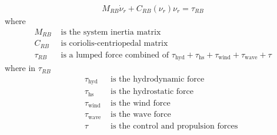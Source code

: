 \begin{align}
M_{RB} \dot \nu_r + C_{RB}(\nu_r)\nu_r = \tau_{RB}
\label{eq:rigidmodel}
\end{align}
where
\begin{align}
M_{RB} &\text{ is the system inertia matrix}\nonumber\\
C_{RB} &\text{ is coriolis-centriopedal matrix}\nonumber\\
\tau_{RB} &\text{ is a lumped force combined of } \tau_{\text{hyd}} + \tau_{\text{hs}} + \tau_{\text{wind}} + \tau_{\text{wave}} + \tau\nonumber
\end{align}
where in $\tau_{RB}$
\begin{align}
\qquad \tau_{\text{hyd}} &\text{ is the hydrodynamic force}\nonumber\\
\qquad \tau_{\text{hs}} &\text{ is the hydrostatic force}\nonumber\\
\qquad \tau_{\text{wind}} &\text{ is the wind force}\nonumber\\
\qquad \tau_{\text{wave}} &\text{ is the wave force}\nonumber\\
\qquad \tau &\text{ is the control and propulsion forces}\nonumber
\end{align}

